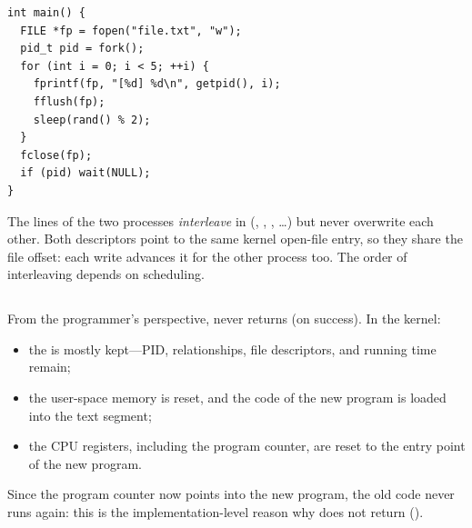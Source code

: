\begin{example}
\label{ex:shared-file}
\begin{lstlisting}
int main() {
  FILE *fp = fopen("file.txt", "w");
  pid_t pid = fork();
  for (int i = 0; i < 5; ++i) {
    fprintf(fp, "[%d] %d\n", getpid(), i);
    fflush(fp);
    sleep(rand() % 2);
  }
  fclose(fp);
  if (pid) wait(NULL);
}
\end{lstlisting}
  The lines of the two processes \emph{interleave} in  (, , , \dots) but never overwrite each other. Both descriptors point to the same kernel open-file entry, so they share the file offset: each write advances it for the other process too. The order of interleaving depends on scheduling.
\end{example}

\subsection{\texorpdfstring{}{execve()}}

From the programmer's perspective,  never returns (on success). In the kernel:
\begin{itemize}
  \item the \ts{} is mostly kept---PID, relationships, file descriptors, and running time remain;
  \item the user-space memory is reset, and the code of the new program is loaded into the text segment;
  \item the CPU registers, including the program counter, are reset to the entry point of the new program.
\end{itemize}
Since the program counter now points into the new program, the old code never runs again: this is the implementation-level reason why  does not return ().

